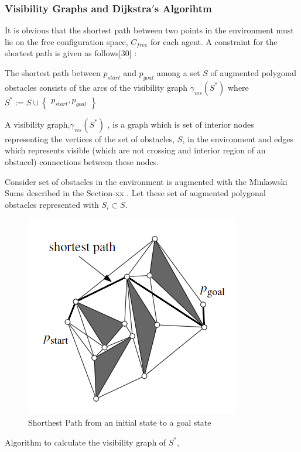 \documentclass[twoside]{article}
\begin{document}
	
	\subsubsection{Visibility Graphs and Dijkstra$'$s Algorihtm}
It is obvious that the shortest path between two points in the environment must lie on the free configuration space, $C_{free}$ for each agent. A constraint for the shortest path is given as follows[30] : 
\begin{displayquote}
The shortest path between $p_{start}$ and $p_{goal}$ among a set $S$ of augmented polygonal obstacles consists of the arcs of the visibility graph $\gamma_{vis}(S^*)$ where $S^* := S \cup \begin{Bmatrix}
p_{start}, p_{goal}
\end{Bmatrix}$
\end{displayquote}
A visibility graph,$\gamma_{vis}(S^*)$ , is a graph which is set of interior nodes representing the vertices of the set of obstacles, $S$, in the environment and edges which represents visible (which are not crossing and interior region of an obstacel) connections between these nodes. 

Consider set of obstacles in the environment is augmented with the Minkowski Sums described in the Section-xx . Let these set of augmented polygonal obstacles represented with $S_i \subset S$. 
	\begin{figure}[H]
		\caption{Shorthest Path from an initial state to a goal state}
		\centering
		\includegraphics[scale = 0.4]{shortest}
	\end{figure} 
	Algorithm to calculate the visibility graph of $S^*$,
	
\end{document}
